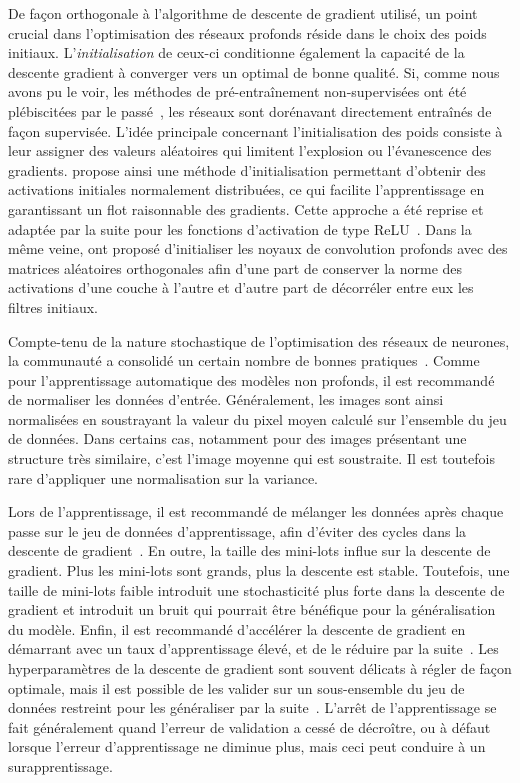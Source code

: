 De façon orthogonale à l'algorithme de descente de gradient utilisé, un point crucial dans l'optimisation des réseaux profonds réside dans le choix des poids initiaux. L'\emph{initialisation} de ceux-ci conditionne également la capacité de la descente gradient à converger vers un optimal de bonne qualité. Si, comme nous avons pu le voir, les méthodes de pré-entraînement non-supervisées ont été plébiscitées par le passé~\cite{hinton_fast_2006,bengio_greedy_2007}, les réseaux sont dorénavant directement entraînés de façon supervisée. L'idée principale concernant l'initialisation des poids consiste à leur assigner des valeurs aléatoires qui limitent l'explosion ou l'évanescence des gradients. \citet{glorot_understanding_2010-1} propose ainsi une méthode d'initialisation permettant d'obtenir des activations initiales normalement distribuées, ce qui facilite l'apprentissage en garantissant un flot raisonnable des gradients. Cette approche a été reprise et adaptée par la suite pour les fonctions d'activation de type \gls{ReLU}~\cite{he_delving_2015}. Dans la même veine, \citet{saxe_exact_2013} ont proposé d'initialiser les noyaux de convolution profonds avec des matrices aléatoires orthogonales afin d'une part de conserver la norme des activations d'une couche à l'autre et d'autre part de décorréler entre eux les filtres initiaux.

Compte-tenu de la nature stochastique de l'optimisation des réseaux de neurones, la communauté a consolidé un certain nombre de bonnes pratiques~\cite{lecun_efficient_1998,bengio_practical_2012,bottou_stochastic_2012}. Comme pour l'apprentissage automatique des modèles non profonds, il est recommandé de normaliser les données d'entrée. Généralement, les images sont ainsi normalisées en soustrayant la valeur du pixel moyen calculé sur l'ensemble du jeu de données. Dans certains cas, notamment pour des images présentant une structure très similaire, c'est l'image moyenne qui est soustraite. Il est toutefois rare d'appliquer une normalisation sur la variance.

Lors de l'apprentissage, il est recommandé de mélanger les données après chaque passe sur le jeu de données d'apprentissage, afin d'éviter des cycles dans la descente de gradient~\cite{lecun_efficient_1998}. En outre, la taille des mini-lots influe sur la descente de gradient. Plus les mini-lots sont grands, plus la descente est stable. Toutefois, une taille de mini-lots faible introduit une stochasticité plus forte dans la descente de gradient et introduit un bruit qui pourrait être bénéfique pour la généralisation du modèle. Enfin, il est recommandé d'accélérer la descente de gradient en démarrant avec un taux d'apprentissage élevé, et de le réduire par la suite~\cite{bengio_practical_2012}. Les hyperparamètres de la descente de gradient sont souvent délicats à régler de façon optimale, mais il est possible de les valider sur un sous-ensemble du jeu de données restreint pour les généraliser par la suite~\cite{bottou_stochastic_2012}. L'arrêt de l'apprentissage se fait généralement quand l'erreur de validation a cessé de décroître, ou à défaut lorsque l'erreur d'apprentissage ne diminue plus, mais ceci peut conduire à un surapprentissage.


